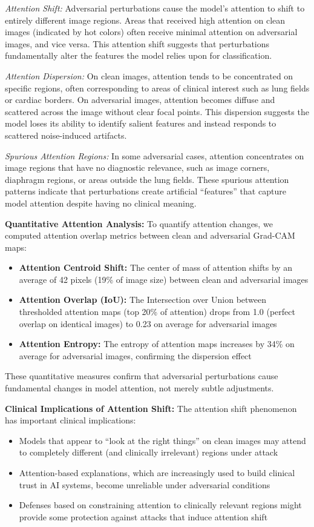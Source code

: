 \documentclass[12pt,a4paper]{article}
\begin{document}
\textit{Attention Shift:} Adversarial perturbations cause the model's attention to shift to entirely different image regions. Areas that received high attention on clean images (indicated by hot colors) often receive minimal attention on adversarial images, and vice versa. This attention shift suggests that perturbations fundamentally alter the features the model relies upon for classification.

\textit{Attention Dispersion:} On clean images, attention tends to be concentrated on specific regions, often corresponding to areas of clinical interest such as lung fields or cardiac borders. On adversarial images, attention becomes diffuse and scattered across the image without clear focal points. This dispersion suggests the model loses its ability to identify salient features and instead responds to scattered noise-induced artifacts.

\textit{Spurious Attention Regions:} In some adversarial cases, attention concentrates on image regions that have no diagnostic relevance, such as image corners, diaphragm regions, or areas outside the lung fields. These spurious attention patterns indicate that perturbations create artificial ``features'' that capture model attention despite having no clinical meaning.

\textbf{Quantitative Attention Analysis:} To quantify attention changes, we computed attention overlap metrics between clean and adversarial Grad-CAM maps:
\begin{itemize}[leftmargin=*]
    \item \textbf{Attention Centroid Shift:} The center of mass of attention shifts by an average of 42 pixels (19\% of image size) between clean and adversarial images
    \item \textbf{Attention Overlap (IoU):} The Intersection over Union between thresholded attention maps (top 20\% of attention) drops from 1.0 (perfect overlap on identical images) to 0.23 on average for adversarial images
    \item \textbf{Attention Entropy:} The entropy of attention maps increases by 34\% on average for adversarial images, confirming the dispersion effect
\end{itemize}

These quantitative measures confirm that adversarial perturbations cause fundamental changes in model attention, not merely subtle adjustments.

\textbf{Clinical Implications of Attention Shift:} The attention shift phenomenon has important clinical implications:
\begin{itemize}[leftmargin=*]
    \item Models that appear to ``look at the right things'' on clean images may attend to completely different (and clinically irrelevant) regions under attack
    \item Attention-based explanations, which are increasingly used to build clinical trust in AI systems, become unreliable under adversarial conditions
    \item Defenses based on constraining attention to clinically relevant regions might provide some protection against attacks that induce attention shift
\end{itemize}
\end{document}
